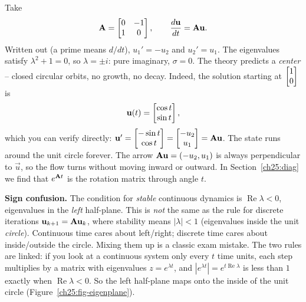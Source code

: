 \begin{example}
\label{ch25:complex}
Take
\[
  \mathbf{A} = \begin{bmatrix} 0 & -1 \\ 1 & 0 \end{bmatrix},
  \qquad \frac{d\mathbf{u}}{dt}=\mathbf{A}\mathbf{u}.
\]
Written out (a prime means $d/dt$), $u_1' = -u_2$ and $u_2' = u_1$. The eigenvalues satisfy
$\lambda^2 + 1 = 0$, so $\lambda = \pm i$: pure imaginary, $\sigma=0$. The theory
predicts a \emph{center} -- closed circular orbits, no growth, no decay. Indeed,
the solution starting at $\begin{bmatrix}1\\0\end{bmatrix}$ is
\[
  \mathbf{u}(t) = \begin{bmatrix}\cos t\\ \sin t\end{bmatrix},
\]
which you can verify directly: $\mathbf{u}'=\begin{bmatrix}-\sin t\\\cos t\end{bmatrix}
=\begin{bmatrix}-u_2\\u_1\end{bmatrix}=\mathbf{A}\mathbf{u}$. The state runs around the unit circle
forever. The arrow $\mathbf{A}\mathbf{u}=(-u_2,u_1)$ is always perpendicular to
$\vec{u}$, so the flow turns without moving inward or outward. In
Section~\ref{ch25:diag} we find that $e^{\mathbf{A}t}$ is the rotation matrix
through angle $t$.
\end{example}

\begin{trapbox}
\textbf{Sign confusion.} The condition for \emph{stable} continuous dynamics is
$\operatorname{Re}\lambda < 0$, eigenvalues in the \emph{left} half-plane. This is
\emph{not} the same as the rule for discrete iterations $\mathbf{u}_{k+1} =
\mathbf{A}\mathbf{u}_k$, where stability means $|\lambda| < 1$ (eigenvalues inside the
unit \emph{circle}). Continuous time cares about left/right; discrete time cares
about inside/outside the circle. Mixing them up is a classic exam mistake. The
two rules are linked: if you look at a continuous system only every $t$ time
units, each step multiplies by a matrix with eigenvalues $z = e^{\lambda t}$, and
$|e^{\lambda t}| = e^{t\operatorname{Re}\lambda}$ is less than $1$ exactly when
$\operatorname{Re}\lambda<0$. So the left half-plane maps onto
the inside of the unit circle (Figure~\ref{ch25:fig-eigenplane}).
\end{trapbox}

